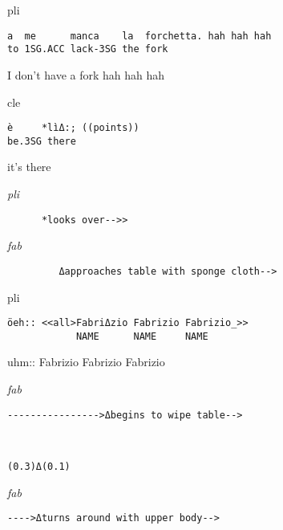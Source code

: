 \documentclass[output=paper,modfonts]{langscibook}
\begin{document}
\vspace{2mm}
%
\begin{transbox}{1}{pli}
\begin{verbatim}
a  me      manca    la  forchetta. hah hah hah
to 1SG.ACC lack-3SG the fork
\end{verbatim}
I don't have a fork hah hah hah
\end{transbox}\vspace{2mm}
%
\vspace{-1mm}
%
\begin{transbox}{3}{cle}
\begin{verbatim}
è     *lìΔ:; ((points))
be.3SG there
\end{verbatim}
it's there
\end{transbox}\vspace{2mm}
%
\begin{transbox}{4}{\textit{pli}}
\begin{verbatim}
      *looks over-->>
\end{verbatim}
\end{transbox}\vspace{-0.5mm}
%
\begin{transbox}{5}{\textit{fab}}
\begin{verbatim}
         Δapproaches table with sponge cloth-->
\end{verbatim}
\end{transbox}
%
\begin{transbox}{6}{pli}
\begin{verbatim}
öeh:: <<all>FabriΔzio Fabrizio Fabrizio_>>
            NAME      NAME     NAME
\end{verbatim}
uhm:: \hspace{0.9cm} Fabrizio Fabrizio Fabrizio
\end{transbox}\vspace{2.5mm}
%
\begin{transbox}{7}{\textit{fab}}
\begin{verbatim}
---------------->Δbegins to wipe table-->
\end{verbatim}
\end{transbox}\vspace{-0.5mm}
%
\begin{transbox}{8}{~}
\begin{verbatim}
(0.3)Δ(0.1)
\end{verbatim}
\end{transbox}
%
\begin{transbox}{9}{\textit{fab}}
\begin{verbatim}
---->Δturns around with upper body-->
\end{verbatim}
\end{transbox}\vspace{-0.5mm}
\end{document}
